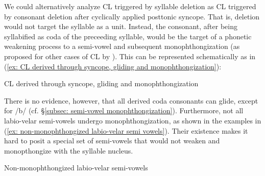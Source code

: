 We could alternatively analyze CL triggered by syllable deletion as CL triggered by consonant deletion after cyclically applied posttonic syncope. That is, deletion would not target the syllable as a unit. Instead, the consonant, after being syllabified as coda of the preceeding syllable, would be the target of a phonetic weakening process to a semi-vowel and subsequent monophthongization (as proposed for other cases of CL by \citealt{de1979compensatory}). This can be represented schematically as in (\ref{ex: CL derived through syncope, gliding and monophthongization}):

\ea\label{ex: CL derived through syncope, gliding and monophthongization}
{CL derived through syncope, gliding and monophthongization}



\z

There is no evidence, however, that all derived coda consonants can glide, except for /b/ (cf. §\ref{subsec: semi-vowel monophthongization}). Furthermore, not all labio-velar semi-vowels undergo monophthongization, as shown in the examples in (\ref{ex: non-monophthongized labio-velar semi vowels}). Their existence makes it hard to posit a special set of semi-vowels that would not weaken and monopthongize with the syllable nucleus.

\ea\label{ex: non-monophthongized labio-velar semi vowels}
{Non-monophthongized labio-velar semi-vowels}

    \z
\z

